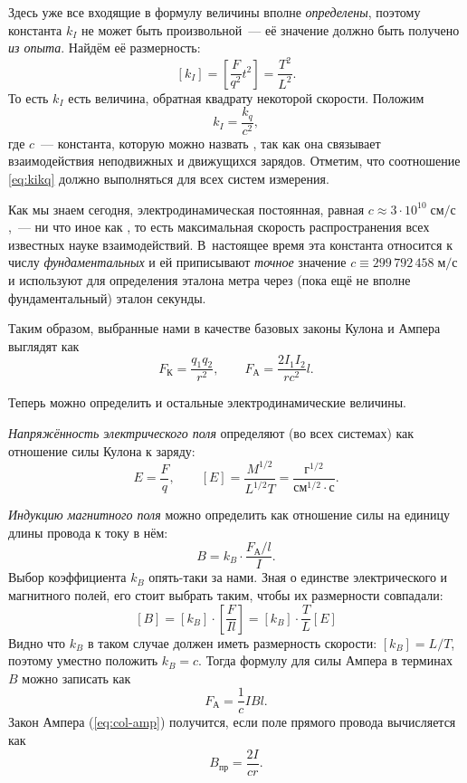 Здесь уже все входящие в формулу величины вполне \emph{определены},
поэтому константа $k_{I}$ не может быть произвольной~--- её значение
должно быть получено \emph{из опыта}. Найдём её размерность:
\[
\left[k_{I}\right]=\left[\frac{F}{q^{2}}t^{2}\right]=\frac{T^{2}}{L^{2}}.
\]
То есть $k_{I}$ есть величина, обратная квадрату некоторой скорости.
Положим
\begin{equation}
k_{I}=\frac{k_{q}}{c^{2}},\label{eq:kikq}
\end{equation}
где $c$~--- константа, которую можно назвать , так как она связывает взаимодействия неподвижных и движущихся
зарядов. Отметим, что соотношение \ref{eq:kikq} должно выполняться
для всех систем измерения.

Как мы знаем сегодня, электродинамическая постоянная,
равная $c\approx3\cdot10^{10}\;\text{см}/\text{с}$,~--- ни что иное
как , то есть максимальная скорость
распространения всех известных науке взаимодействий. В~настоящее время
эта константа относится к числу \emph{фундаментальных} и ей приписывают
\emph{точное} значение $c\equiv299\,792\,458\;\text{м/с}$
и используют для определения эталона метра через (пока ещё не вполне
фундаментальный) эталон секунды.

Таким образом, выбранные нами в качестве базовых законы Кулона и Ампера
выглядят как
\begin{equation}
F_{\text{К}}=\frac{q_{1}q_{2}}{r^{2}},\qquad F_{\text{А}}=\frac{2I_{1}I_{2}}{rc^{2}}l.\label{eq:col-amp}
\end{equation}

Теперь можно определить и остальные электродинамические величины.

\emph{Напряжённость электрического поля} определяют (во всех системах)
как отношение силы Кулона к заряду:
\[
E=\frac{F}{q},\qquad\left[E\right]=\frac{M^{1/2}}{L^{1/2}T}=\frac{\text{г}^{1/2}}{\text{см}^{1/2}\cdot\text{с}}.
\]

\emph{Индукцию магнитного поля} можно определить как отношение силы
на единицу длины провода к току в нём:
\begin{equation}
B=k_{B}\cdot\frac{F_{\text{А}}/l}{I}.\label{eq:kB}
\end{equation}
Выбор коэффициента $k_{B}$ опять-таки за нами. Зная о единстве электрического
и магнитного полей, его стоит выбрать таким, чтобы их размерности
совпадали:
\[
\left[B\right]=\left[k_{B}\right]\cdot\left[\frac{F}{Il}\right]=\left[k_{B}\right]\cdot\frac{T}{L}\left[E\right]
\]
Видно что $k_{B}$ в таком случае должен иметь размерность скорости:
$\left[k_{B}\right]=L/T$, поэтому уместно положить $k_{B}=c$. Тогда
формулу для силы Ампера в терминах $B$ можно записать как
\begin{equation}
F_{\text{А}}=\frac{1}{c}IBl.
\end{equation}
Закон Ампера (\ref{eq:col-amp}) получится, если поле прямого провода
вычисляется как
\[
B_{\text{пр}}=\dfrac{2I}{cr}.
\]

